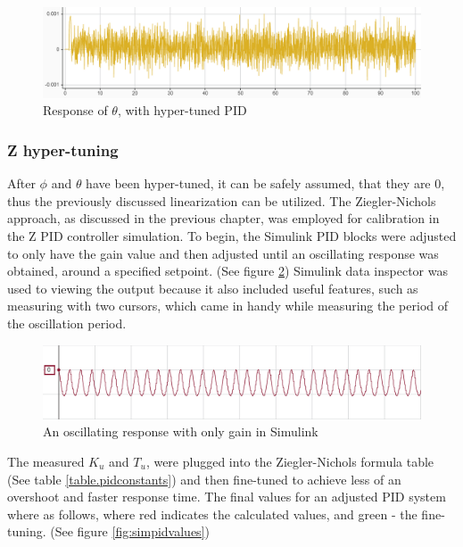 \begin{figure}[H]
    \begin{center}
    \includegraphics[scale=0.7]{pictures/control/thetaPID.PNG}
    \end{center}
    \caption{Response of $\theta$, with hyper-tuned PID}
    \label{fig:thetaPID}
\end{figure}

\subsubsection{Z hyper-tuning}
After $\phi$ and $\theta$ have been hyper-tuned, it can be safely assumed, that they are 0, thus the previously discussed linearization can be utilized. 
The Ziegler-Nichols approach, as discussed in the previous chapter, was employed for calibration in the Z PID controller simulation. To begin, the Simulink PID blocks were adjusted to only have the gain value and then adjusted until an oscillating response was obtained, around a specified setpoint. (See figure \ref{fig:posc}) Simulink data inspector was used to viewing the output because it also included useful features, such as measuring with two cursors, which came in handy while measuring the period of the oscillation period.

\begin{figure}[H]
    \begin{center}
    \includegraphics[scale=0.75]{pictures/control/posc}
    \end{center}
    \caption{An oscillating response with only gain in Simulink}
    \label{fig:posc}
\end{figure}

The measured $K_u$ and $T_u$, were plugged into the Ziegler-Nichols formula table (See table \ref{table.pidconstants}) and then fine-tuned to achieve less of an overshoot and faster response time.
The final values for an adjusted PID system where as follows, where red indicates the calculated values, and green - the fine-tuning. (See figure \ref{fig:simpidvalues})

